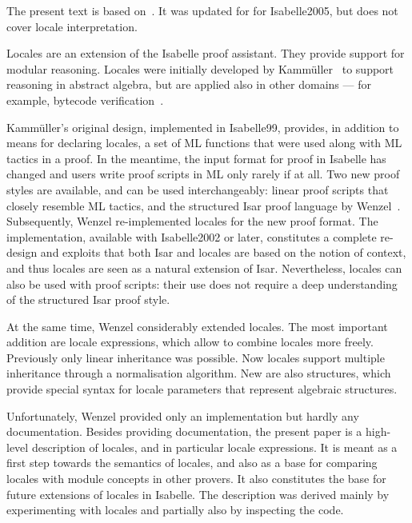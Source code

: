 %
\begin{isabellebody}%
\def\isabellecontext{Locales}%
%
\isadelimtheory
\isanewline
%
\endisadelimtheory
%
\isatagtheory
%
\endisatagtheory
{\isafoldtheory}%
%
\isadelimtheory
%
\endisadelimtheory
%
\isadelimML
%
\endisadelimML
%
\isatagML
%
\endisatagML
{\isafoldML}%
%
\isadelimML
%
\endisadelimML
%
\isamarkuptrue%
%
\begin{isamarkuptext}%
The present text is based on~\cite{Ballarin2004a}.  It was updated
  for for Isabelle2005, but does not cover locale interpretation.

  Locales are an extension of the Isabelle proof assistant.  They
  provide support for modular reasoning. Locales were initially
  developed by Kamm\"uller~\cite{Kammuller2000} to support reasoning
  in abstract algebra, but are applied also in other domains --- for
  example, bytecode verification~\cite{Klein2003}.

  Kamm\"uller's original design, implemented in Isabelle99, provides, in
  addition to
  means for declaring locales, a set of ML functions that were used
  along with ML tactics in a proof.  In the meantime, the input format
  for proof in Isabelle has changed and users write proof
  scripts in ML only rarely if at all.  Two new proof styles are
  available, and can
  be used interchangeably: linear proof scripts that closely resemble ML
  tactics, and the structured Isar proof language by
  Wenzel~\cite{Wenzel2002a}.  Subsequently, Wenzel re-implemented
  locales for
  the new proof format.  The implementation, available with
  Isabelle2002 or later, constitutes a complete re-design and exploits that
  both Isar and locales are based on the notion of context,
  and thus locales are seen as a natural extension of Isar.
  Nevertheless, locales can also be used with proof scripts:
  their use does not require a deep understanding of the structured
  Isar proof style.

  At the same time, Wenzel considerably extended locales.  The most
  important addition are locale expressions, which allow to combine
  locales more freely.  Previously only
  linear inheritance was possible.  Now locales support multiple
  inheritance through a normalisation algorithm.  New are also
  structures, which provide special syntax for locale parameters that
  represent algebraic structures.

  Unfortunately, Wenzel provided only an implementation but hardly any
  documentation.  Besides providing documentation, the present paper
  is a high-level description of locales, and in particular locale
  expressions.  It is meant as a first step towards the semantics of
  locales, and also as a base for comparing locales with module concepts
  in other provers.  It also constitutes the base for future
  extensions of locales in Isabelle.
  The description was derived mainly by experimenting
  with locales and partially also by inspecting the code.


\end{isamarkuptext}
\end{isabellebody}
